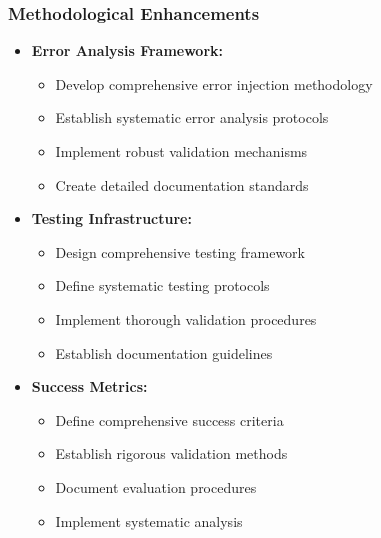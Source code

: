 \subsubsection{Methodological Enhancements}
\begin{itemize}
    \item \textbf{Error Analysis Framework:}
        \begin{itemize}
            \item Develop comprehensive error injection methodology
            \item Establish systematic error analysis protocols
            \item Implement robust validation mechanisms
            \item Create detailed documentation standards
        \end{itemize}
    \item \textbf{Testing Infrastructure:}
        \begin{itemize}
            \item Design comprehensive testing framework
            \item Define systematic testing protocols
            \item Implement thorough validation procedures
            \item Establish documentation guidelines
        \end{itemize}
    \item \textbf{Success Metrics:}
        \begin{itemize}
            \item Define comprehensive success criteria
            \item Establish rigorous validation methods
            \item Document evaluation procedures
            \item Implement systematic analysis
        \end{itemize}
\end{itemize}

